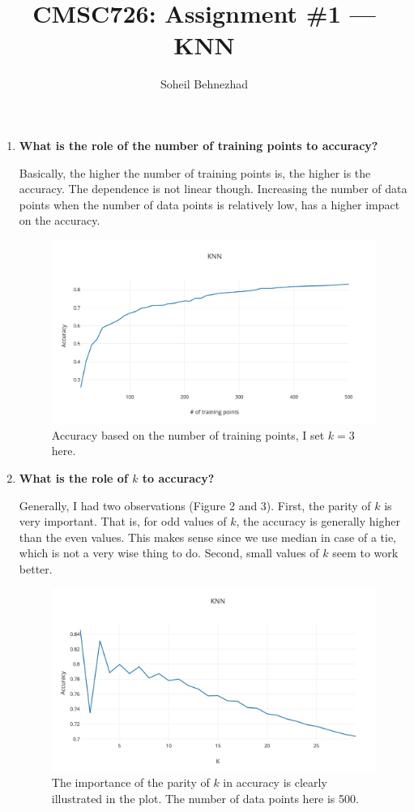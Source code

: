 \documentclass[letterpaper,11pt]{article}
\author{Soheil Behnezhad}
\title{CMSC726: Assignment \#1 --- KNN}
\begin{document}
\maketitle

\begin{enumerate}

\item \textbf{What is the role of the number of training points to accuracy?}

Basically, the higher the number of training points is, the higher is the accuracy. The dependence is not linear though. Increasing the number of data points when the number of data points is relatively low, has a higher impact on the accuracy.
\begin{figure}[hbt]
  \centering
  \includegraphics[scale=0.5]{per-limit.png}
  \caption{Accuracy based on the number of training points, I set $k=3$ here.}
\end{figure}

\item \textbf{What is the role of $k$ to accuracy?}

Generally, I had two observations (Figure 2 and 3). First, the parity of $k$ is very important. That is, for odd values of $k$, the accuracy is generally higher than the even values. This makes sense since we use median in case of a tie, which is not a very wise thing to do. Second, small values of $k$ seem to work better.

\begin{figure}[h!]
  \centering
  \includegraphics[scale=0.5]{per-k.png}
  \caption{The importance of the parity of $k$ in accuracy is clearly illustrated in the plot. The number of data points here is 500.}
\end{figure}


\end{enumerate}
\end{document}
